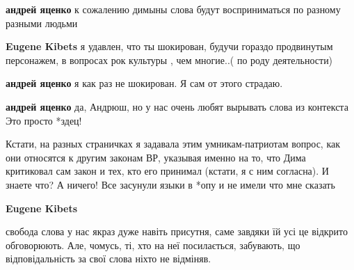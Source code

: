 \begin{itemize}
\begin{itemize}
\textbf{андрей яценко} к сожалению димыны слова будут восприниматься по разному разными людьми

 
\textbf{Eugene Kibets} я удавлен, что ты шокирован, будучи гораздо продвинутым персонажем, в вопросах рок культуры , чем многие..( по роду деятельности)

 
\textbf{андрей яценко} я как раз не шокирован. Я сам от этого страдаю.

 
\textbf{андрей яценко} да, Андрюш, но у нас очень любят вырывать слова из контекста 🤦
Это просто *здец!

 

Кстати, на разных страничках я задавала этим умникам-патриотам вопрос, как они
относятся к другим законам ВР, указывая именно на то, что Дима критиковал сам
закон и тех, кто его принимал (кстати, я с ним согласна). И знаете что? А
ничего! Все засунули языки в *опу и не имели что мне сказать🤷


 
\textbf{Eugene Kibets} 

свобода слова у нас якраз дуже навіть присутня, саме завдяки їй усі це відкрито
обговорюють. Але, чомусь, ті, хто на неї посилається, забувають, що
відповідальність за свої слова ніхто не відміняв.


\end{itemize}
\end{itemize}
